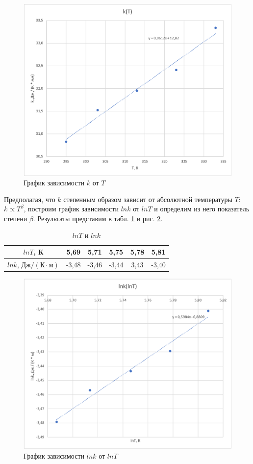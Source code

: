 \documentclass[a4paper, 12pt]{article}
\begin{document}
\begin{enumerate}
        \begin{figure}[ht]
            \centering
            \includegraphics[width=0.6\linewidth]{images/k(T).png}
            \caption{График зависимости $k$ от $T$}
            \label{pic5}
        \end{figure}
        
        Предполагая, что $k$ степенным образом зависит от абсолютной температуры $T$: $k \propto T^{\beta}$, построим график зависимости $lnk$ от $lnT$ и определим из него показатель степени $\beta$. Результаты представим в табл. \ref{table6} и рис. \ref{pic6}.
        
        \vspace{0.7cm}
        
        \begin{table}[h!]
            \centering
            \begin{tabular}{|c|c|c|c|c|c|}
                \hline
                $lnT$, К & 5,69 & 5,71 & 5,75 & 5,78 & 5,81 \\
                \hline
                $lnk$, $Дж / (К \cdot м)$ & -3,48 & -3,46 & -3,44 & 3,43 & -3,40 \\
                \hline
            \end{tabular}
            \caption{$lnT$ и $lnk$}
            \label{table6}
        \end{table}
        
        \begin{figure}[ht]
            \centering
            \includegraphics[width=0.6\linewidth]{images/lnk(lnT).png}
            \caption{График зависимости $lnk$ от $lnT$}
            \label{pic6}
        \end{figure}
        

\end{enumerate}
\end{document}
